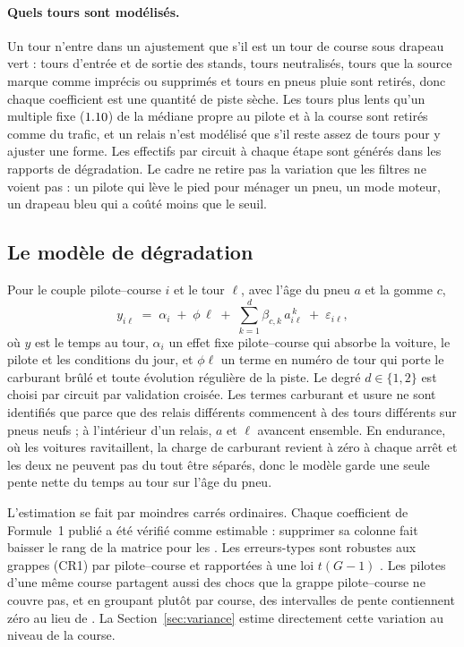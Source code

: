 \documentclass[11pt,a4paper]{article}
\begin{document}
\paragraph{Quels tours sont modélisés.} Un tour n'entre dans un ajustement que
s'il est un tour de course sous drapeau vert : tours d'entrée et de sortie des
stands, tours neutralisés, tours que la source marque comme imprécis ou
supprimés et tours en pneus pluie sont retirés, donc chaque coefficient est une
quantité de piste sèche. Les tours plus lents qu'un multiple fixe
($1.10{}$) de la médiane propre au pilote et à la course sont retirés
comme du trafic, et un relais n'est modélisé que s'il reste assez de tours pour
y ajuster une forme. Les effectifs par circuit à chaque étape sont générés dans
les rapports de dégradation. Le cadre ne retire pas la variation que les filtres
ne voient pas : un pilote qui lève le pied pour ménager un pneu, un mode moteur,
un drapeau bleu qui a coûté moins que le seuil.

\subsection{Le modèle de dégradation}

Pour le couple pilote--course $i$ et le tour $\ell$, avec l'âge du pneu $a$ et
la gomme $c$,
%
\begin{equation}
y_{i\ell} \;=\; \alpha_i \;+\; \phi\,\ell \;+\; \sum_{k=1}^{d}\beta_{c,k}\,a_{i\ell}^{\,k} \;+\; \varepsilon_{i\ell},
\label{eq:degradation}
\end{equation}
%
où $y$ est le temps au tour, $\alpha_i$ un effet fixe pilote--course qui absorbe
la voiture, le pilote et les conditions du jour, et $\phi\ell$ un terme en numéro
de tour qui porte le carburant brûlé et toute évolution régulière de la piste.
Le degré $d \in \{1,2\}$ est choisi par circuit par validation croisée. Les
termes carburant et usure ne sont identifiés que parce que des relais différents
commencent à des tours différents sur pneus neufs ; à l'intérieur d'un relais,
$a$ et $\ell$ avancent ensemble. En endurance, où les voitures ravitaillent, la
charge de carburant revient à zéro à chaque arrêt et les deux ne peuvent pas du
tout être séparés, donc le modèle garde une seule pente nette du temps au tour
sur l'âge du pneu.

L'estimation se fait par moindres carrés ordinaires. Chaque coefficient de
Formule~1 publié a été vérifié comme estimable : supprimer sa colonne fait
baisser le rang de la matrice pour les \EstChecked{}. Les erreurs-types sont
robustes aux grappes (CR1) par pilote--course et rapportées à une loi $t(G-1)$
\citep{cameron2015}. Les pilotes d'une même course partagent aussi des chocs que
la grappe pilote--course ne couvre pas, et en groupant plutôt par course,
\RaceClusterZero{} des \RaceClusterN{} intervalles de pente contiennent zéro au
lieu de \RaceClusterZeroDr{}. La Section~\ref{sec:variance} estime directement
cette variation au niveau de la course.
\end{document}

